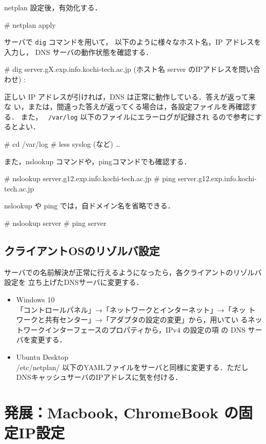 netplan 設定後，有効化する．

\begin{cli}
# netplan apply
\end{cli}

サーバで \texttt{dig} コマンドを用いて，
以下のように様々なホスト名，IP アドレスを入力し，
DNS サーバの動作状態を確認する．
\begin{cli}
# dig server.gX.exp.info.kochi-tech.ac.jp
 (ホスト名 server のIPアドレスを問い合わせ)
 :

\end{cli}
正しい IP アドレスが引ければ，DNS は正常に動作している．答えが返って来な
い，または，間違った答えが返ってくる場合は，各設定ファイルを再確認する．
また， \texttt{ /var/log} 以下のファイルにエラーログが記録され
るので参考にするとよい．
\begin{cli}
# cd /var/log
# less syslog (など)
 …
\end{cli}

また，nslookup コマンドや，pingコマンドでも確認する．

\begin{cli}
# nslookup server.g12.exp.info.kochi-tech.ac.jp
# ping server.g12.exp.info.kochi-tech.ac.jp

nslookup や ping では，自ドメイン名を省略できる．

# nslookup server
# ping server

\end{cli}

\subsection{クライアントOSのリゾルバ設定}
 サーバでの名前解決が正常に行えるようになったら，各クライアントのリゾルバ設定を
 立ち上げたDNSサーバに変更する．

\begin{itemize}
  \item Windows 10\\
	「コントロールパネル」→「ネットワークとインターネット」→「ネッ
	トワークと共有センター」→「アダプタの設定の変更」から，用いてい
	るネットワークインターフェースのプロパティから，IPv4 の設定の項
	の DNS サーバを変更する．
  \item Ubuntu Desktop\\
    /etc/netplan/ 以下のYAMLファイルをサーバと同様に変更する．ただしDNSキャッシュサーバのIPアドレスに気を付ける．
\end{itemize}

\section{発展：Macbook, ChromeBook の固定IP設定}

